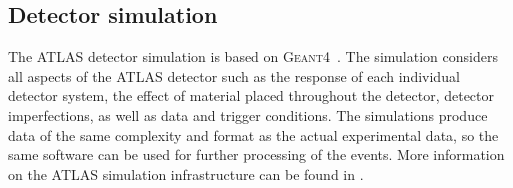

\subsection{Detector simulation}
The ATLAS detector simulation is based on \textsc{Geant4}~\cite{Agostinelli:2002hh}.
The simulation considers all aspects of the ATLAS detector such as the response of each individual detector system, the effect of material placed throughout the detector, detector imperfections, as well as data and trigger conditions.
The simulations produce data of the same complexity and format as the actual experimental data, so the same software can be used for further processing of the events.
More information on the ATLAS simulation infrastructure can be found in .

